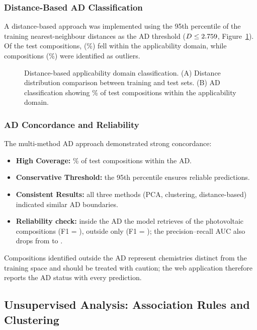 \subsubsection{Distance-Based AD Classification}
A distance-based approach was implemented using the 95th percentile of the training
nearest-neighbour distances as the AD threshold ($D \le 2.759{}$, Figure~\ref{fig:addist}).
Of the \ADNTest{} test compositions, \ADNIn{} (\ADFracIn{}\%) fell within the applicability
domain, while \ADNOut{} compositions (\ADFracOut{}\%) were identified as outliers.

\begin{figure}[H]
  \centering
  \caption{Distance-based applicability domain classification. (A) Distance distribution
  comparison between training and test sets. (B) AD classification showing \ADFracIn{}\% of
  test compositions within the applicability domain.}\label{fig:addist}
\end{figure}

\subsubsection{AD Concordance and Reliability}
The multi-method AD approach demonstrated strong concordance:
\begin{itemize}
  \item \textbf{High Coverage:} \ADFracIn{}\% of test compositions within the AD.
  \item \textbf{Conservative Threshold:} the 95th percentile ensures reliable predictions.
  \item \textbf{Consistent Results:} all three methods (PCA, clustering, distance-based)
  indicated similar AD boundaries.
  \item \textbf{Reliability check:} inside the AD the model retrieves \ADRecInT{} of the
  photovoltaic compositions (F1 = \ADFoneInT{}), outside only \ADRecOutT{} (F1 =
  \ADFoneOutT{}); the precision--recall AUC also drops from \ADPRIn{} to \ADPROut{}.
\end{itemize}

Compositions identified outside the AD represent chemistries distinct from the training space
and should be treated with caution; the web application therefore reports the AD status with
every prediction.

\clearpage
\subsection{Unsupervised Analysis: Association Rules and Clustering}

